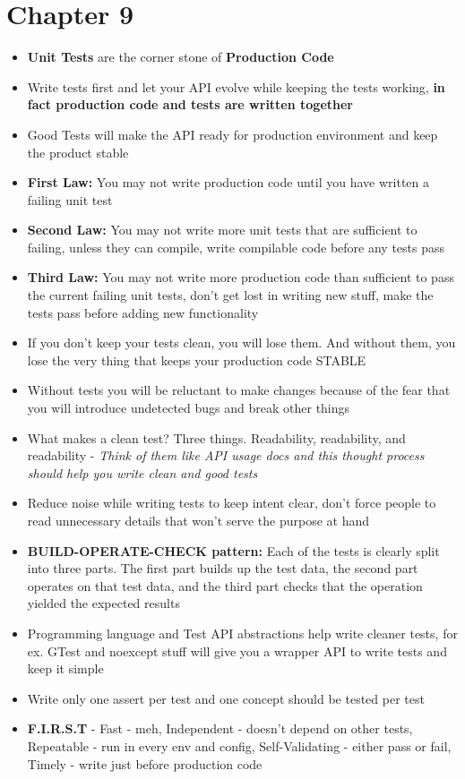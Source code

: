 \documentclass[14pt]{article}
\begin{document}
\section*{Chapter 9}
\begin{itemize}

	\item \textbf{Unit Tests} are the corner stone of \textbf{Production Code}
	\item Write tests first and let your API evolve while keeping the tests working, \textbf{in fact production code and tests are written together}
	\item Good Tests will make the API ready for production environment and keep the product stable 
	\item \textbf{First Law:} You may not write production code until you have written a failing unit test
	\item \textbf{Second Law:} You may not write more unit tests that are sufficient to failing, unless they can compile, write compilable code before any tests pass
	\item \textbf{Third Law:} You may not write more production code than sufficient to pass the current failing unit tests, don't get lost in writing new stuff, make the tests pass before adding new functionality
	\item If you don’t keep your tests clean, you will lose them. And without them, you lose the very thing that keeps your production code STABLE
	\item Without tests you will be reluctant to make changes because of the fear that you will introduce undetected bugs and break other things
	\item What makes a clean test? Three things. Readability, readability, and readability - \textit{Think of them like API usage docs and this thought process should help you write clean and good tests}
	\item Reduce noise while writing tests to keep intent clear, don't force people to read unnecessary details that won't serve the purpose at hand
	\item \textbf{BUILD-OPERATE-CHECK pattern:} Each of the tests is clearly split into three parts. The first part builds up the test data, the second part operates on that test data, and the third part checks that the operation yielded the expected results
	\item Programming language and Test API abstractions help write cleaner tests, for ex. GTest and noexcept stuff will give you a wrapper API to write tests and keep it simple
	\item Write only one assert per test and one concept should be tested per test
	\item \textbf{F.I.R.S.T} - Fast - meh, Independent - doesn't depend on other tests, Repeatable - run in every env and config, Self-Validating - either pass or fail, Timely - write just before production code
	
\end{itemize}
\end{document}

